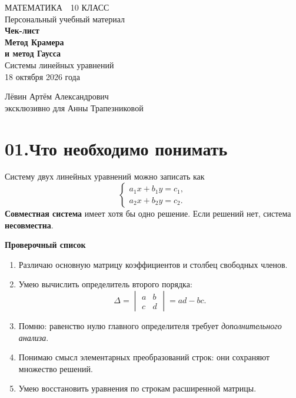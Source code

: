 \documentclass[a4paper,12pt]{article}
\newcommand{\strong}[1]{{\color{darkaccent}\textbf{#1}}}
\newcommand{\task}[1]{\item #1}
\begin{document}
\thispagestyle{empty}
\vspace*{32mm}
\begin{center}
{\color{accent}\large МАТЕМАТИКА \,\textbullet\, 10 КЛАСС}\\[14mm]
{\color{softgray}\large Персональный учебный материал}\\[8mm]
{\Huge\bfseries Чек-лист}\\[8mm]
{\LARGE\bfseries\color{darkaccent} Метод Крамера\\[2mm] и метод Гаусса}\\[15mm]
{\Large Системы линейных уравнений}\\[19mm]
{\color{textgray}\large 18 октября 2026 года}
\end{center}
\vfill
\begin{center}
{\color{darkaccent}\large Лёвин Артём Александрович}\\[2mm]
{\large эксклюзивно для Анны Трапезниковой}
\end{center}
\vspace{14mm}
\clearpage

\section*{\color{darkaccent}01.\quad Что необходимо понимать}
Систему двух линейных уравнений можно записать как
\[
\begin{cases}
a_1x+b_1y=c_1,\\
a_2x+b_2y=c_2.
\end{cases}
\]
\strong{Совместная система} имеет хотя бы одно решение. Если решений нет, система \strong{несовместна}.

\textbf{Проверочный список}
\begin{enumerate}[label=$\square$,leftmargin=11mm,itemsep=0.3em]
\task Различаю основную матрицу коэффициентов и столбец свободных членов.
\task Умею вычислить определитель второго порядка:
\[
\Delta=\begin{vmatrix}a&b\\c&d\end{vmatrix}=ad-bc.
\]
\task Помню: равенство нулю главного определителя требует \emph{дополнительного анализа}.
\task Понимаю смысл элементарных преобразований строк: они сохраняют множество решений.
\task Умею восстановить уравнения по строкам расширенной матрицы.
\end{enumerate}
\end{document}
